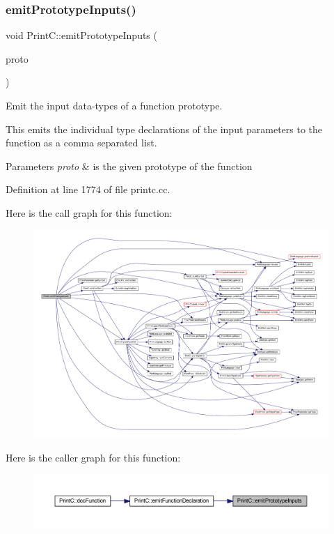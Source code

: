 \subsubsection{\texorpdfstring{emitPrototypeInputs()}{emitPrototypeInputs()}}
{\footnotesize\ttfamily void Print\+C\+::emit\+Prototype\+Inputs (\begin{DoxyParamCaption}\item[{const \mbox{\hyperlink{class_func_proto}{Func\+Proto}} $\ast$}]{proto }\end{DoxyParamCaption})\hspace{0.3cm}{\ttfamily [protected]}}



Emit the input data-\/types of a function prototype. 

This emits the individual type declarations of the input parameters to the function as a comma separated list. 
\begin{DoxyParams}{Parameters}
{\em proto} & is the given prototype of the function \\
\hline
\end{DoxyParams}


Definition at line 1774 of file printc.\+cc.

Here is the call graph for this function\+:
\nopagebreak
\begin{figure}[H]
\begin{center}
\leavevmode
\includegraphics[width=350pt]{class_print_c_a316a42f523295a421f9d40f0b3fcf92e_cgraph}
\end{center}
\end{figure}
Here is the caller graph for this function\+:
\nopagebreak
\begin{figure}[H]
\begin{center}
\leavevmode
\includegraphics[width=350pt]{class_print_c_a316a42f523295a421f9d40f0b3fcf92e_icgraph}
\end{center}
\end{figure}
\mbox{\label{class_print_c_a037bdd9a25c0bb21308609afde6452d3}} 
